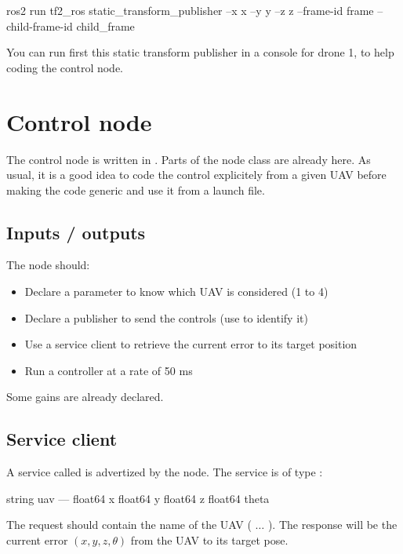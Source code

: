 \documentclass{ecnreport}
\begin{document}
\begin{bashcodelarge}
 ros2 run tf2_ros static_transform_publisher --x x --y y --z z
            --frame-id frame --child-frame-id child_frame
\end{bashcodelarge}

 You can run first this static transform publisher in a console for drone 1, to help coding the control node.

\section{Control node}

The control node is written in . Parts of the node class are already here.
As usual, it is a good idea to code the control explicitely from a given UAV before making the code generic and use it from a launch file.

\subsection{Inputs / outputs}

The node should:
\begin{itemize}
 \item Declare a parameter to know which UAV is considered (1 to 4)
 \item Declare a publisher to send the controls (use  to identify it)
 \item Use a service client to retrieve the current error to its target position
 \item Run a controller at a rate of 50 ms
\end{itemize}

Some gains are already declared.

\subsection{Service client}

A service called  is advertized by the  node. The service is of type :
\begin{bashcode}
string uav
---
float64 x
float64 y
float64 z
float64 theta
\end{bashcode}
The request should contain the name of the UAV ( $\hdots$ ). The response will be the current error $(x,y,z,\theta)$ from the UAV to its target pose.
\end{document}
